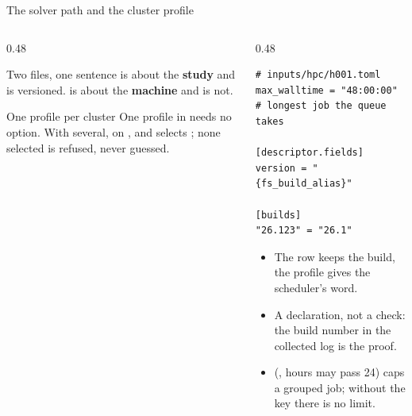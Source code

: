\begin{frame}[fragile]{The solver path and the cluster profile}
\begin{columns}[T]
\begin{column}{0.48\textwidth}
\begin{block}{Two files, one sentence}
\small {} is about the \textbf{study} and is versioned.
 is about the \textbf{machine} and is not.
\end{block}
\begin{alertblock}{One profile per cluster}
\small One profile in  needs no option. With several,
 on ,  and  selects
; none selected is refused, never guessed.
\end{alertblock}
\end{column}
\begin{column}{0.48\textwidth}
\begin{lstlisting}[style=ftsbase]
# inputs/hpc/h001.toml
max_walltime = "48:00:00"   # longest job the queue takes

[descriptor.fields]
version = "{fs_build_alias}"

[builds]
"26.123" = "26.1"
\end{lstlisting}
\begin{itemize}\small
  \item The row keeps the build, the profile gives the scheduler's word.
  \item A declaration, not a check: the build number in the collected log is
        the proof.
  \item {} (, hours may pass 24) caps a
        grouped job; without the key there is no limit.
\end{itemize}
\end{column}
\end{columns}
\end{frame}

